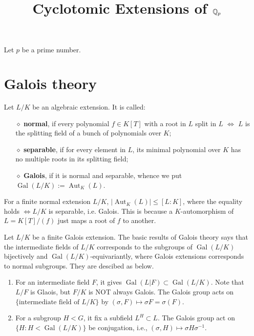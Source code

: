 \documentclass{article}
\title{Cyclotomic Extensions of $\mathbb{Q}_p$}
\author{}
\date{}
\theoremstyle{definition}
\theoremstyle{remark}
\DeclareMathOperator{\gal}{Gal}
\DeclareMathOperator{\aut}{Aut} %
\begin{document}
\maketitle

Let $p$ be a prime number.

\section{Galois theory}
Let $L/K$ be an algebraic extension. It is called: \begin{enumerate}
    \item [$\diamond$]\textbf{normal}, if every polynomial $f\in K[T]$ with a root in $L$ split in $L$ $\iff$ $L$ is the splitting field of a bunch of polynomials over $K$;
    \item [$\diamond$]\textbf{separable}, if for every element in $L$, its minimal polynomial over $K$ has no multiple roots in its splitting field;
    \item [$\diamond$]\textbf{Galois}, if it is normal and separable, whence we put $\gal(L/K) := \aut_K(L)$.
\end{enumerate}
For a finite normal extension $L/K$, $|\aut_K(L)| \le [L:K]$, where the equality holds $\iff L/K$ is separable, i.e. Galois. This is because a $K$-automorphism of $L = K[T]/(f)$ just maps a root of $f$ to another.

Let $L/K$ be a finite Galois extension. The basic results of Galois theory says that the intermediate fields of $L/K$ corresponds to the subgroups of $\gal(L/K)$ bijectively and $\gal(L/K)$-equivariantly, where Galois extensions corresponds to normal subgroups.
They are descibed as below.
\begin{enumerate}
    \item For an intermediate field $F$, it gives $\gal(L|F)\subset \gal(L/K)$. Note that $L/F$ is Glaois, but $F/K$ is NOT always Galois.
    The Galois group acts on $\{\text{intermediate field of } L/K\}$ by $(\sigma, F) \mapsto \sigma F = \sigma(F)$.
    \item For a subgroup $H < G$, it fix a subfield $L^H \subset L$. The Galois group act on $\{H : H < \gal(L/K)\}$ be conjugation, i.e., $(\sigma, H) \mapsto \sigma H\sigma^{-1}$.
\end{enumerate}
\end{document}
